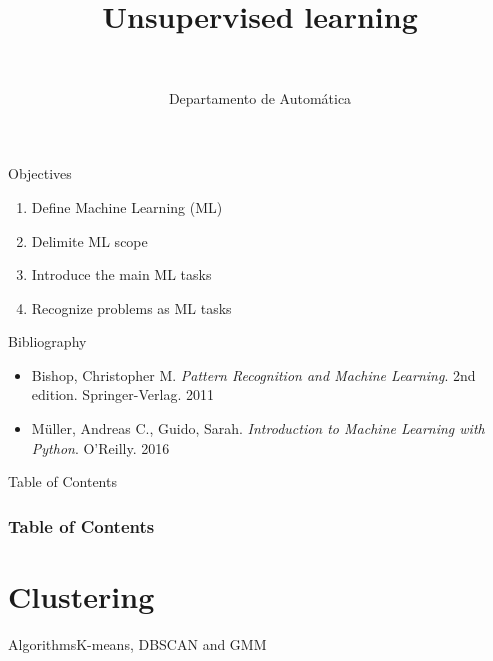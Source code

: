 \documentclass[10pt,compress]{beamer} %
\title[Unsupervised learning]{Unsupervised learning}
\author{\asignatura\\\carrera}
\institute{}
\date{Departamento de Automática}
\begin{document}
{\titlepageBlue
    \begin{frame}
        \titlepage
    \end{frame}
}

\institute{\asignatura}

\begin{frame}[plain]{}
   \begin{block}{Objectives}
      \begin{enumerate}
         \item Define Machine Learning (ML)
		 \item Delimite ML scope
         \item Introduce the main ML tasks
         \item Recognize problems as ML tasks
      \end{enumerate} 
   \end{block}

   \begin{block}{Bibliography}
	\begin{itemize}
        \item Bishop, Christopher M. \textit{Pattern Recognition and Machine Learning}. 2nd edition. Springer-Verlag. 2011
        \item M\"uller, Andreas C., Guido, Sarah. \textit{Introduction to Machine Learning with Python}. O'Reilly. 2016
	\end{itemize}
   \end{block}
\end{frame}

{
\begin{frame}[shrink]{Table of Contents}

 	\frametitle{Table of Contents}
  	\begin{multicols}{2}
  		\tableofcontents
    \end{multicols}

\end{frame}
}

\section{Clustering}
{
\sectionheaderWhite %
\begin{frame}{Algorithms}{K-means, DBSCAN and GMM}
\end{frame}
}
\end{document}
